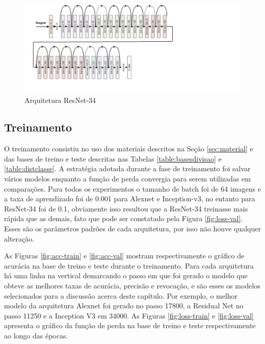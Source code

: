 \begin{figure}
\centering
\includegraphics[scale=0.83]{figuras/resnet-34.png}
\caption{Arquitetura ResNet-34}
\label{fig:resnet-34}
\end{figure}



\subsection{Treinamento}
O treinamento consistiu no uso dos materiais descritos na Seção \ref{sec:material} e das bases de treino e teste descritas nas Tabelas \ref{table:basesdivisao} e \ref{table:distclasse}. A estratégia adotada durante a fase de treinamento foi salvar vários modelos enquanto a função de perda convergia para serem utilizadas em comparações. Para todos os experimentos o tamanho de batch foi de 64 imagens e a taxa de aprendizado foi de 0.001 para Alexnet e Inception-v3, no entanto para ResNet-34 foi de 0.1, obviamente isso resultou que a ResNet-34 treinasse mais rápida que as demais, fato que pode ser constatado pela Figura \ref{fig:loss-val}. Esses são os parâmetros padrões de cada arquitetura, por isso não houve qualquer alteração. 

As Figuras \ref{fig:acc-train} e \ref{fig:acc-val} mostram respectivamente o gráfico de acurácia na base de treino e teste durante o treinamento. Para cada arquitetura há uma linha na vertical demarcando o passo em que foi gerado o modelo que obteve as melhores taxas de acurácia, precisão e revocação, e são esses os modelos selecionados para a discussão acerca deste capítulo. Por exemplo, o melhor modelo da arquitetura Alexnet foi gerado no passo 17800, a Residual Net no passo 11250 e a Inception V3 em 34000. As Figuras \ref{fig:loss-train} e \ref{fig:loss-val} apresenta o gráfico da função de perda na base de treino e teste respectivamente ao longo das épocas.


